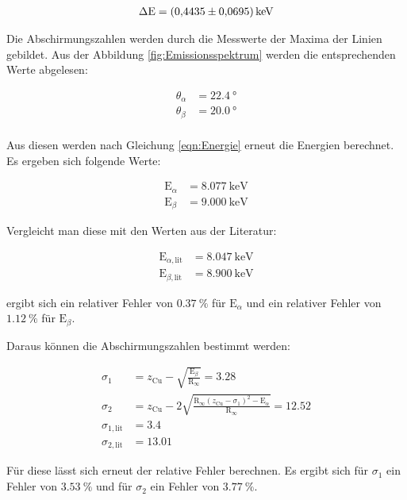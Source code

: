\begin{align*}
  \Delta\text{E} = \SI{0.4435\pm0.0695}{\kilo\electronvolt}
\end{align*}


Die Abschirmungszahlen werden durch die Messwerte der Maxima der Linien gebildet.
Aus der Abbildung \ref{fig:Emissionsspektrum} werden die entsprechenden Werte abgelesen:

\begin{align*}
  \theta_{\alpha} &= \SI{22.4}{\degree} \\
  \theta_{\beta} &= \SI{20.0}{\degree} \\
\end{align*}

Aus diesen werden nach Gleichung \eqref{eqn:Energie} erneut die Energien berechnet.
Es ergeben sich folgende Werte:

\begin{align*}
  \text{E}_{\alpha} &= \SI{8.077}{\kilo\electronvolt} \\
  \text{E}_{\beta} &= \SI{9.000}{\kilo\electronvolt}
\end{align*}

Vergleicht man diese mit den Werten aus der Literatur:

\begin{align*}
  \text{E}_{\alpha, \text{lit}} &= \SI{8.047}{\kilo\electronvolt} \\
  \text{E}_{\beta,  \text{lit}} &= \SI{8.900}{\kilo\electronvolt}
\end{align*}

ergibt sich ein relativer Fehler von $\SI{0.37}{\percent}$ für $\text{E}_{\alpha}$ und ein relativer Fehler von $\SI{1.12}{\percent}$ für $\text{E}_{\beta}$.

Daraus können die Abschirmungszahlen bestimmt werden:

\begin{align*}
  \sigma_1 &= z_\text{Cu} - \sqrt{\frac{\text{E}_{\beta}}{\text{R}_{\infty}}} = 3.28\\
  \sigma_2 &= z_\text{Cu} - 2\sqrt{\frac{\text{R}_{\infty} \left(z_\text{Cu} - \sigma_1 \right)^2 - \text{E}_{\alpha}}{\text{R}_{\infty}}} = 12.52 \\
  \sigma_{1, \text{lit}} &= 3.4 \\
  \sigma_{2, \text{lit}} &= 13.01
\end{align*}

Für diese lässt sich erneut der relative Fehler berechnen.
Es ergibt sich für $\sigma_1$ ein Fehler von $\SI{3.53}{\percent}$ und für $\sigma_2$ ein Fehler von $\SI{3.77}{\percent}$.


